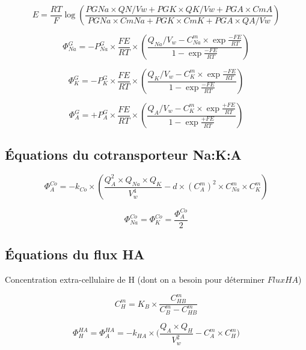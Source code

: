 \documentclass[a4paper,fleqn]{article}
\begin{document}
\begin{equation}
E =  \frac{RT}{F}\log{\left(\frac{{PGNa}\times{QN}/Vw + {PGK}\times{QK/Vw} + {PGA}\times{CmA}}{{PGNa}\times{CmNa} + {PGK}\times{CmK} + {PGA}\times{QA/Vw}}\right)}
\end{equation}

\begin{equation}
\Phi_{Na}^{G}={-P_{Na}^{G}}\times{\frac{FE}{RT}}\times{\left(\frac{Q_{Na}/V_w-{C_{Na}^{m}}\times{\exp{\frac{-FE}{RT}}}}{1 - \exp{\frac{-FE}{RT}}}\right)}
\end{equation}

\begin{equation}
\Phi_{K}^{G}={-P_{K}^{G}}\times{\frac{FE}{RT}}\times{\left(\frac{Q_{K}/V_w-{C_{K}^{m}}\times{\exp{\frac{-FE}{RT}}}}{1 - \exp{\frac{-FE}{RT}}}\right)}
\end{equation}

\begin{equation}
\Phi_{A}^{G}={+P_{A}^{G}}\times{\frac{FE}{RT}}\times{\left(\frac{Q_{A}/V_w-{C_{K}^{m}}\times{\exp{\frac{+FE}{RT}}}}{1 - \exp{\frac{+FE}{RT}}}\right)}
\end{equation}

\subsection{Équations du cotransporteur Na:K:A}

\begin{equation}
\Phi_{A}^{Co}={-k_{Co}}\times{\left(\frac{{Q_{A}^2}\times{Q_{Na}}\times{Q_{K}}}{V_w^4}-{d}\times{\left(C_{A}^{m}\right)^2}\times{C_{Na}^{m}}\times{C_{K}^{m}}\right)}
\end{equation}

\begin{equation}
\Phi_{Na}^{Co}=\Phi_{K}^{Co}=\frac{\Phi_{A}^{Co}}{2}
\end{equation}

\subsection{Équations du flux HA}

Concentration extra-cellulaire de H (dont on a besoin pour déterminer $FluxHA$)

\begin{equation}
C_{H}^{m}={K_B}\times{\frac{C_{HB}^{m}}{C_{B}^{m}-C_{HB}^{m}}}
\end{equation}

\begin{equation}
\Phi_{H}^{HA}=\Phi_{A}^{HA}={-k_{HA}}\times{( \frac{{Q_A}\times{Q_H}}{V_w^2} - {C_{A}^{m}}\times{C_{H}^{m}}})
\end{equation}\\
\end{document}
